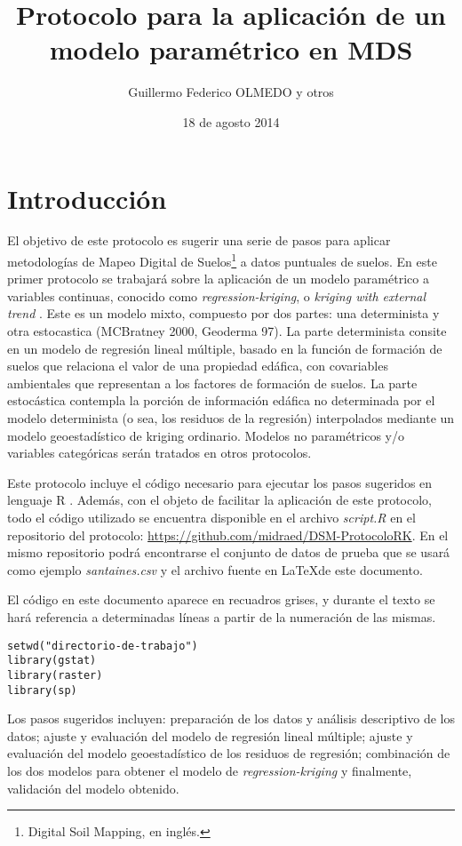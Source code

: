 \documentclass[10pt,a4paper]{article}
\date{18 de agosto 2014}
\title{Protocolo para la aplicación de un modelo paramétrico en MDS}
\author{Guillermo Federico OLMEDO y otros}
\begin{document}
\maketitle
\section{Introducción}
El objetivo de este protocolo es sugerir una serie de pasos para aplicar metodologías de Mapeo Digital de Suelos\footnote{Digital Soil Mapping, en inglés.} a datos puntuales de suelos. En este primer protocolo se trabajará sobre la aplicación de un modelo paramétrico a variables continuas, conocido como \textit{regression-kriging}, o \textit{kriging with external trend} \citep{hengl_practical_2009}. Este es un modelo mixto, compuesto por dos partes: una determinista y otra estocastica (MCBratney 2000, Geoderma 97). La parte determinista consite en un modelo de regresión lineal múltiple, basado en la función de formación de suelos \citep{mcbratney_digital_2003} que relaciona el valor de una propiedad edáfica, con covariables ambientales que representan a los factores de formación de suelos. La parte estocástica contempla la porción de información edáfica no determinada por el modelo determinista (o sea, los residuos de la regresión) interpolados mediante un modelo geoestadístico de kriging ordinario.  Modelos no paramétricos y/o variables categóricas serán tratados en otros protocolos.

Este protocolo incluye el código necesario para ejecutar los pasos sugeridos en lenguaje R \citep{R}. Además, con el objeto de facilitar la aplicación de este protocolo, todo el código utilizado se encuentra disponible en el archivo \textit{script.R} en el repositorio del protocolo: 
\url{https://github.com/midraed/DSM-ProtocoloRK}. En el mismo repositorio podrá encontrarse el conjunto de datos de prueba que se usará como ejemplo \textit{santaines.csv} y el archivo fuente en \LaTeX\space de este documento.

El código en este documento aparece en recuadros grises, y durante el texto se hará referencia a determinadas líneas a partir de la numeración de las mismas.
\begin{lstlisting}
setwd("directorio-de-trabajo")
library(gstat)
library(raster)
library(sp)
\end{lstlisting}
Los pasos sugeridos incluyen: preparación de los datos y  análisis descriptivo de los datos; ajuste y evaluación del modelo de regresión lineal múltiple; ajuste y evaluación del modelo geoestadístico de los residuos de regresión; combinación de los dos modelos para obtener el modelo de \textit{regression-kriging} y finalmente, validación del modelo obtenido.	
\end{document}
